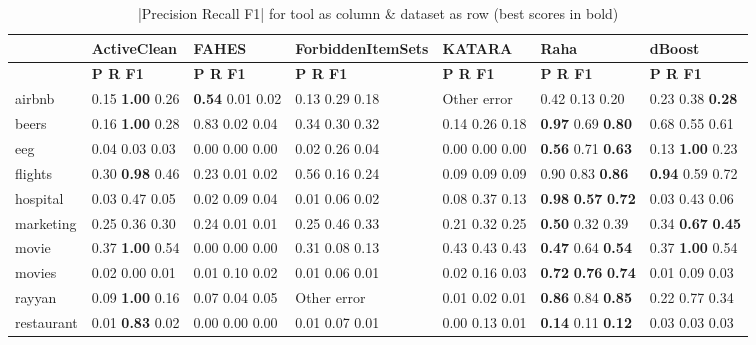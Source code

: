 \begin{table}[H]
\centering
\caption{|Precision Recall F1| for tool as column \& dataset as row (best scores in bold)}
\label{tab:empirical_results}
\begin{adjustbox}{center}
\begin{tabular}{lllllll}
\toprule
{} & ActiveClean & FAHES & ForbiddenItemSets & KATARA & Raha & dBoost \\
\midrule
 & \textbf{\space\space\space P \space\space\space\space R \space\space\space F1} & \textbf{\space\space\space P \space\space\space\space R \space\space\space F1} & \textbf{\space\space\space P \space\space\space\space R \space\space\space F1} & \textbf{\space\space\space P \space\space\space\space R \space\space\space F1} & \textbf{\space\space\space P \space\space\space\space R \space\space\space F1} & \textbf{\space\space\space P \space\space\space\space R \space\space\space F1} \\
airbnb & 0.15 \textbf{1.00} 0.26 & \textbf{0.54} 0.01 0.02 & 0.13 0.29 0.18 & Other error & 0.42 0.13 0.20 & 0.23 0.38 \textbf{0.28} \\
beers & 0.16 \textbf{1.00} 0.28 & 0.83 0.02 0.04 & 0.34 0.30 0.32 & 0.14 0.26 0.18 & \textbf{0.97} 0.69 \textbf{0.80} & 0.68 0.55 0.61 \\
eeg & 0.04 0.03 0.03 & 0.00 0.00 0.00 & 0.02 0.26 0.04 & 0.00 0.00 0.00 & \textbf{0.56} 0.71 \textbf{0.63} & 0.13 \textbf{1.00} 0.23 \\
flights & 0.30 \textbf{0.98} 0.46 & 0.23 0.01 0.02 & 0.56 0.16 0.24 & 0.09 0.09 0.09 & 0.90 0.83 \textbf{0.86} & \textbf{0.94} 0.59 0.72 \\
hospital & 0.03 0.47 0.05 & 0.02 0.09 0.04 & 0.01 0.06 0.02 & 0.08 0.37 0.13 & \textbf{0.98} \textbf{0.57} \textbf{0.72} & 0.03 0.43 0.06 \\
marketing & 0.25 0.36 0.30 & 0.24 0.01 0.01 & 0.25 0.46 0.33 & 0.21 0.32 0.25 & \textbf{0.50} 0.32 0.39 & 0.34 \textbf{0.67} \textbf{0.45} \\
movie & 0.37 \textbf{1.00} 0.54 & 0.00 0.00 0.00 & 0.31 0.08 0.13 & 0.43 0.43 0.43 & \textbf{0.47} 0.64 \textbf{0.54} & 0.37 \textbf{1.00} 0.54 \\
movies & 0.02 0.00 0.01 & 0.01 0.10 0.02 & 0.01 0.06 0.01 & 0.02 0.16 0.03 & \textbf{0.72} \textbf{0.76} \textbf{0.74} & 0.01 0.09 0.03 \\
rayyan & 0.09 \textbf{1.00} 0.16 & 0.07 0.04 0.05 & Other error & 0.01 0.02 0.01 & \textbf{0.86} 0.84 \textbf{0.85} & 0.22 0.77 0.34 \\
restaurant & 0.01 \textbf{0.83} 0.02 & 0.00 0.00 0.00 & 0.01 0.07 0.01 & 0.00 0.13 0.01 & \textbf{0.14} 0.11 \textbf{0.12} & 0.03 0.03 0.03 \\

\end{tabular}
\end{adjustbox}
\end{table}
